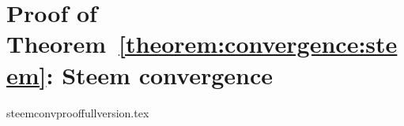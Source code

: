 \section{Proof of Theorem~\ref{theorem:convergence:steem}: Steem convergence}
  \label{appendix:proof}
  {steemconvprooffullversion.tex}
